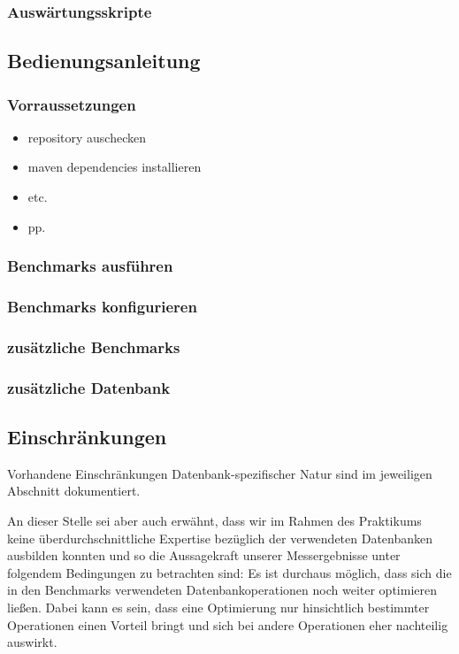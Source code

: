 \documentclass[11pt, a4paper, oneside]{article} %
\begin{document}
\subsubsection{Auswärtungsskripte}

\subsection{Bedienungsanleitung}
\label{subsec:bedienungsanleitung}

\subsubsection{Vorraussetzungen}

\begin{itemize}
\item repository auschecken
\item maven dependencies installieren
\item etc.
\item pp.
\end{itemize}

\subsubsection{Benchmarks ausführen}


\subsubsection{Benchmarks konfigurieren}

\subsubsection{zusätzliche Benchmarks}

\subsubsection{zusätzliche Datenbank}

\subsection{Einschränkungen}

Vorhandene Einschränkungen Datenbank-spezifischer Natur sind im jeweiligen Abschnitt dokumentiert.

An dieser Stelle sei aber auch erwähnt, dass wir im Rahmen des Praktikums keine überdurchschnittliche Expertise bezüglich der verwendeten Datenbanken ausbilden konnten und so die Aussagekraft unserer Messergebnisse unter folgendem Bedingungen zu betrachten sind: Es ist durchaus möglich, dass sich die in den Benchmarks verwendeten Datenbankoperationen noch weiter optimieren ließen. Dabei kann es sein, dass eine Optimierung nur hinsichtlich bestimmter Operationen einen Vorteil bringt und sich bei andere Operationen eher nachteilig auswirkt.
\end{document}
